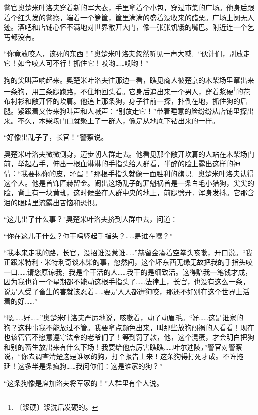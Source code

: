 \documentclass[12pt,UTF-8,openany]{ctexbook}
\begin{document}
\begin{normalsize}
    
    警官奥楚米叶洛夫穿着新的军大衣，手里拿着个小包，穿过市集的广场。他身后跟着个红头发的警察，端着一个箩筐，筐里满满的盛着没收来的醋栗。广场上阒无人迹。酒吧和店铺心怀不满地对世界敞开大门，像一张张饥饿的嘴巴。附近连一个乞丐都没有。
    
    “你竟敢咬人，该死的东西！”奥楚米叶洛夫忽然听见一声大喊。“伙计们，别放走它！如今咬人可不行！抓住它！哎哟……哎哟！”
    
    狗的尖叫声响起来。奥楚米叶洛夫往那边一看，瞧见商人彼楚京的木柴场里窜出来一条狗，用三条腿跑路，不住地回头看。它身后追出来一个男人，穿着浆硬\footnote{〔浆硬〕浆洗后发硬的。}的花布衬衫和敞开怀的坎肩。他追上那条狗，身子往前一探，扑倒在地，抓住狗的后腿。紧跟着又传来狗叫声和人喊声：“别放走它！”带着睡意的脸纷纷从店铺里探出来。不久，木柴场门口就聚上了一群人，像是从地底下钻出来的一样。
    
    “好像出乱子了，长官！”警察说。
    
    奥楚米叶洛夫微微侧身，迈步朝人群走去。他看见那个敞开坎肩的人站在木柴场门前，举起右手，伸出一根血淋淋的手指头给人群看，半醉的脸上露出这样的神情：“我要揭你的皮，坏蛋！”那根手指头就像一面胜利的旗帜。奥楚米叶洛夫认得这个人。他是首饰匠赫留金。闹出这场乱子的罪魁祸首是一条白毛小猎狗，尖尖的脸，背上有一块黄斑，这时候坐在人群中央的地上，前腿劈开，浑身发抖。它那含泪的眼睛里流露出苦恼和恐惧。
    
    “这儿出了什么事？”奥楚米叶洛夫挤到人群中去，问道：
    
    “你在这儿干什么？你干吗竖起手指头？……是谁在嚷？”
    
    “我本来走我的路，长官，没招谁没惹谁……”赫留金凑着空拳头咳嗽，开口说。“我正跟米特利·米特利奇谈木柴的事，忽然间，这个坏东西无缘无故把我的手指头咬一口……请您原谅我，我是个干活的人……我干的是细致活。这得赔我一笔钱才成，因为我也许一个星期都不能动这根手指头了……法律上，长官，也没有这么一条，说是人受了畜生的害就该忍着……要是人人都遭狗咬，那还不如别在这个世界上活着的好……”
    
    “嗯……好……”奥楚米叶洛夫严厉地说，咳嗽着，动了动眉毛。“好……这是谁家的狗？这种事我不能放过不管。我要拿点颜色出来，叫那些放狗闯祸的人看看！现在也该管管不愿意遵守法令的老爷们了！等到罚了款，他，这个混蛋，才会明白把狗和别的畜生放出来有什么下场！我要给他点厉害瞧瞧……叶尔迪陵，”警官对警察说，“你去调查清楚这是谁家的狗，打个报告上来！这条狗得打死才成。不许拖延！这多半是条疯狗……我问你们：这是谁家的狗？”
    
    “这条狗像是席加洛夫将军家的！”人群里有个人说。
    

\end{normalsize}
\end{document}

